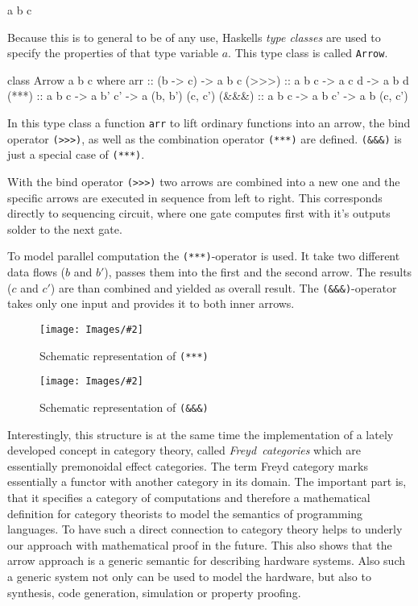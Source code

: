 \documentclass[9pt,final,a4paper,leqno]{article}
\newcommand{\grafik}[4][0.9]{%
    \begin{figure}[ht]%
        \begin{center}
            \texttt{[image: Images/\#2]}
            \caption{\label{#4} #3}
            
        \end{center}
    \end{figure}
}
\newcommand{\boxit}[1]{\mbox{{\it #1}}}
\newcommand{\hs}[1]{\mbox{\lstinline[basicstyle=\color{textgray}]!#1!}}
\begin{document}
\begin{center}
\begin{minipage}{.2\textwidth}
\begin{haskell}
a b c
\end{haskell}
\end{minipage} \end{center}

Because this is to general to be of any use, Haskells \emph{type classes} are used to specify the properties of that type variable $a$. This
type class is called \hs{Arrow}. 

\begin{haskell}
class Arrow a b c where 
  arr   :: (b -> c) -> a b c
  (>>>)  :: a b c    -> a c d   -> a b d
  (***) :: a b c    -> a b' c' -> a (b, b') (c, c')
  (&&&) :: a b c    -> a b  c' -> a  b      (c, c')
\end{haskell}

In this type class a function \hs{arr} to lift ordinary functions into an arrow, the bind operator \hs{(>>>)}, as well as the combination
operator \hs{(***)} are defined. \hs{(&&&)} is just a special case of \hs{(***)}. 

\par
With the bind operator \hs{(>>>)} two arrows are combined into a new one and the specific arrows are executed in sequence from left to
right. This corresponds directly to sequencing circuit, where one gate computes first with it's outputs solder to the next gate. 
\par 
To model parallel computation the \hs{(***)}-operator is used. It take two different data flows ($b$ and $b'$), passes them into the first
and the second arrow. The results ($c$ and $c'$) are than combined and yielded as overall result. The \hs{(&&&)}-operator takes only one
input and provides it to both inner arrows.

\grafik[.6]{ArrowStarStarStar}{Schematic representation of \hs{(***)}}{figure:ststst}
\grafik[.6]{ArrowAndAndAnd}{Schematic representation of \hs{(&&&)}}{figure:ananan}

\par
Interestingly, this structure is at the same time the implementation of a lately developed concept in category theory, called \boxit{Freyd
categories} which are essentially premonoidal effect categories\cite{Heunen06arrows, Hughes98generalisingmonads,PatersonRA}. The term Freyd
category marks essentially a functor with another category in its domain. The important part is, that it specifies a category of
computations and therefore a mathematical definition for category theorists to model the semantics of programming languages. To have such a
direct connection to category theory helps to underly our approach with mathematical proof in the future. This also shows that the arrow
approach is a generic semantic for describing hardware systems. Also such a generic system not only can be used to model the hardware, but
also to synthesis, code generation, simulation or property proofing. 
\end{document}
